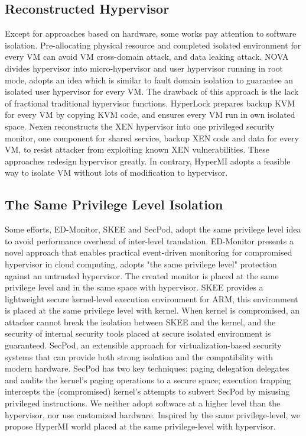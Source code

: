 \documentclass[conference]{IEEEtran}
\begin{document}
\subsection{Reconstructed Hypervisor }
Except for approaches based on hardware, some works\cite{nexen,Steinberg2010NOVA,hyperlock} pay attention to software isolation. Pre-allocating physical resource and completed isolated environment for every VM can avoid VM cross-domain attack, and data leaking attack. NOVA\cite{Steinberg2010NOVA} divides hypervisor into micro-hypervisor and user hypervisor running in root mode, adopts an idea which is similar to fault domain isolation to guarantee an isolated user hypervisor for every VM. The drawback of this approach is the lack of fractional traditional hypervisor functions. HyperLock \cite{hyperlock} prepares backup KVM for every VM by copying KVM code, and ensures every VM run in own isolated space. Nexen\cite{nexen} reconstructs the XEN hypervisor into one privileged security monitor, one component for shared service, backup XEN code and data for every VM, to resist attacker from exploiting known XEN vulnerabilities. These approaches redesign hypervisor greatly. In contrary, HyperMI adopts a feasible way to isolate VM without lots of modification to hypervisor. 
\subsection{The Same Privilege Level Isolation}
Some efforts, ED-Monitor\cite{Deng2017Dancing}, SKEE\cite{Azab2016SKEE} and SecPod\cite{Wang2015SecPod}, adopt the same privilege level idea to avoid performance overhead of inter-level translation. ED-Monitor presents a novel approach that enables practical event-driven monitoring for compromised hypervisor in cloud computing, adopts "the same privilege level" protection against an untrusted hypervisor. The created monitor is placed at the same privilege level and in the same space with hypervisor. SKEE provides a lightweight secure kernel-level execution environment for ARM, this environment is placed at the same privilege level with kernel. When kernel is compromised, an attacker cannot break the isolation between SKEE and the kernel, and the security of internal security tools placed at secure isolated environment is guaranteed. SecPod, an extensible approach for virtualization-based security systems that can provide both strong isolation and the compatibility with modern hardware. SecPod has two key techniques: paging delegation delegates and audits the kernel's paging operations to a secure space; execution trapping intercepts the (compromised) kernel's attempts to subvert SecPod by misusing privileged instructions.
We neither adopt software at a higher level than the hypervisor, nor use customized hardware. Inspired by the same privilege-level, we propose HyperMI world placed at the same privilege-level with hypervisor.
\end{document}
